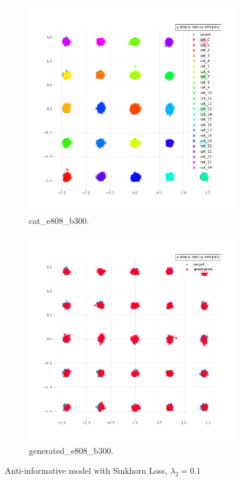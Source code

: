 \begin{figure}[!htbp]
   \centering
\begin{subfigure}[t]{0.48\textwidth}
   \includegraphics[width=\textwidth,center]{2019-04-30/gaussian/anti-info/cat_e808_b300.png}
   \caption{cat_e808_b300.}
   \label{fig:.._.._notes_journal_figures_2019-04-30_gaussian_anti-info-a}
\end{subfigure}
\begin{subfigure}[t]{0.48\textwidth}
   \includegraphics[width=\textwidth,center]{2019-04-30/gaussian/anti-info/generated_e808_b300.png}
   \caption{generated_e808_b300.}
   \label{fig:.._.._notes_journal_figures_2019-04-30_gaussian_anti-info-b}
\end{subfigure}
   \caption{Anti-informative model with Sinkhorn Loss, $\lambda_2 = 0.1$}
   \label{fig:2019-04-30_gaussian_anti-info}
\end{figure}
